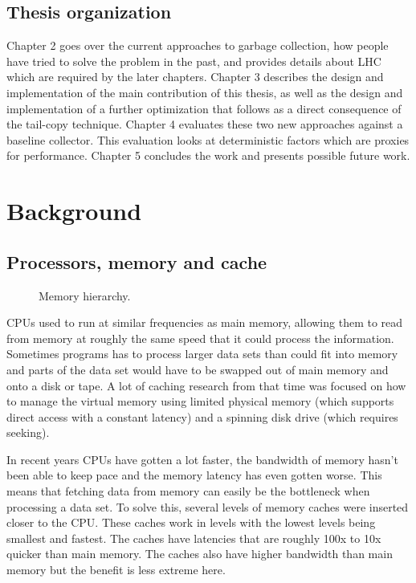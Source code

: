 \documentclass[a4paper,oneside]{memoir}
\begin{document}
\section{Thesis organization}
Chapter 2 goes over the current approaches to garbage collection, how people
have tried to solve the problem in the past, and provides details about
LHC which are required by the later chapters.
Chapter 3 describes the design and implementation of the main contribution of
this thesis, as well as the design and implementation of a further optimization
that follows as a direct consequence of the tail-copy technique.
Chapter 4 evaluates these two new approaches against a baseline collector. This
evaluation looks at deterministic factors which are proxies for performance.
Chapter 5 concludes the work and presents possible future work.

\chapter{Background}
\section{Processors, memory and cache}

\begin{figure}
  \centering
  
  \caption{Memory hierarchy.}
\end{figure}

CPUs used to run at similar frequencies as main memory, allowing them to read
from memory at roughly the same speed that it could process the information.
Sometimes programs has to process larger data sets than could fit into memory
and parts of the data set would have to be swapped out of main memory and onto
a disk or tape. A lot of caching research from that time was focused on how to
manage the virtual memory using limited physical memory (which supports direct
access with a constant latency) and a spinning disk drive (which requires seeking).

In recent years CPUs have gotten a lot faster, the bandwidth of memory
hasn't been able to keep pace and the memory latency has even gotten worse. This
means that fetching data from memory can easily be the bottleneck when processing
a data set. To solve this, several levels of memory caches were inserted closer
to the CPU. These caches work in levels with the lowest levels being smallest
and fastest. The caches have latencies that are roughly 100x to 10x quicker
than main memory. The caches also have higher bandwidth than main memory but
the benefit is less extreme here.
\end{document}
